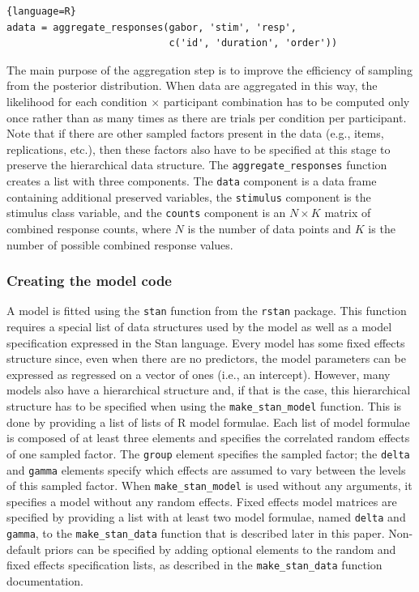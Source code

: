 \documentclass[a4paper,man,apacite,floatsintext]{apa6}
\newcommand{\code}[1]{\texttt{#1}}
\begin{document}
\begin{lstlisting}{language=R}
adata = aggregate_responses(gabor, 'stim', 'resp', 
                            c('id', 'duration', 'order'))  
\end{lstlisting}

The main purpose of the aggregation step is to improve the efficiency
of sampling from the posterior distribution. When data are aggregated
in this way, the likelihood for each condition $\times$ participant
combination has to be computed only once rather than as many times as
there are trials per condition per participant. Note that if there are
other sampled factors present in the data (e.g., items, replications,
etc.), then these factors also have to be specified at this stage to
preserve the hierarchical data structure. The
\code{aggregate\_responses} function creates a list with three
components. The \code{data} component is a data frame containing
additional preserved variables, the \code{stimulus} component is the
stimulus class variable, and the \code{counts} component is an
$N\times K$ matrix of combined response counts, where $N$ is the
number of data points and $K$ is the number of possible combined
response values.

\subsubsection{Creating the model code}

A model is fitted using the \code{stan} function from the \code{rstan}
package. This function requires a special list of data structures used
by the model as well as a model specification expressed in the Stan
language. Every model has some fixed effects structure since, even
when there are no predictors, the model parameters can be expressed as
regressed on a vector of ones (i.e., an intercept). However, many
models also have a hierarchical structure and, if that is the case,
this hierarchical structure has to be specified when using the
\code{make\_stan\_model} function. This is done by providing a list of
lists of R model formulae. Each list of model formulae is composed of
at least three elements and specifies the correlated random effects of
one sampled factor. The \code{group} element specifies the sampled
factor; the \code{delta} and \code{gamma} elements specify which
effects are assumed to vary between the levels of this sampled
factor. When \code{make\_stan\_model} is used without any arguments, it
specifies a model without any random effects. Fixed effects model
matrices are specified by providing a list with at least two model
formulae, named \code{delta} and \code{gamma}, to the
\code{make\_stan\_data} function that is described later in this
paper. Non-default priors can be specified by adding optional elements
to the random and fixed effects specification lists, as described in
the \code{make\_stan\_data} function documentation.
\end{document}
